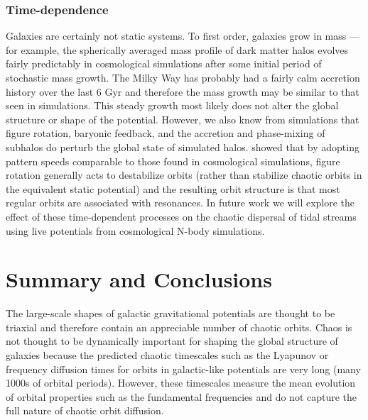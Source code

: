 \documentclass[letterpaper,12pt,preprint]{aastex}
\begin{document}
\subsubsection{Time-dependence}

Galaxies are certainly not static systems. To first order, galaxies grow in mass --- for example, the spherically averaged mass profile of dark matter halos evolves fairly predictably in cosmological simulations \citep{wechsler02, buist14} after some initial period of stochastic mass growth. The Milky Way has probably had a fairly calm accretion history over the last 6 Gyr and therefore the mass growth may be similar to that seen in simulations. This steady growth most likely does not alter the global structure or shape of the potential. However, we also know from simulations that figure rotation, baryonic feedback, and the accretion and phase-mixing of subhalos do perturb the global state of simulated halos. \cite{deibel11} showed that by adopting pattern speeds comparable to those found in cosmological simulations, figure rotation generally acts to destabilize orbits (rather than stabilize chaotic orbits in the equivalent static potential) and the resulting orbit structure is that most regular orbits are associated with resonances. In future work we will explore the effect of these time-dependent processes on the chaotic dispersal of tidal streams using live potentials from cosmological N-body simulations.

\section{Summary and Conclusions}\label{sec:conclusions}

The large-scale shapes of galactic gravitational potentials are thought to be triaxial and therefore contain an appreciable number of chaotic orbits. Chaos is not thought to be dynamically important for shaping the global structure of galaxies because the predicted chaotic timescales such as the Lyapunov or frequency diffusion times for orbits in galactic-like potentials are very long (many 1000s of orbital periods). However, these timescales measure the mean evolution of orbital properties such as the fundamental frequencies and do not capture the full nature of chaotic orbit diffusion.
\end{document}
